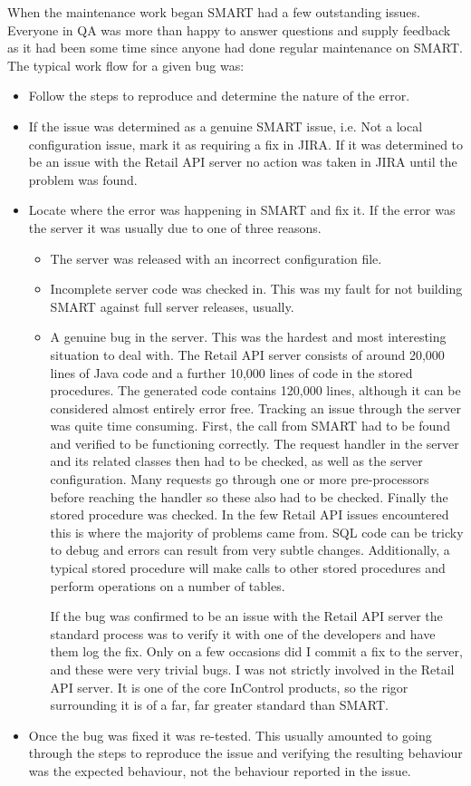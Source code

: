 \documentclass[a4paper, 11pt, titlepage]{article}
\begin{document}
When the maintenance work began SMART had a few outstanding issues. Everyone in QA was more than happy to answer questions and supply feedback as it had been some time since anyone had done regular maintenance on SMART. 
The typical work flow for a given bug was:
\begin{itemize} 
\item Follow the steps to reproduce and determine the nature of the error. 
\item If the issue was determined as a genuine SMART issue, i.e. Not a local configuration issue, mark it as requiring a fix in JIRA. If it was determined to be an issue with the Retail API server no action was taken in JIRA until the problem was found. 
\item Locate where the error was happening in SMART and fix it. If the error was the server it was usually due to one of three reasons. 
\begin{itemize} 
\item The server was released with an incorrect configuration file. 
\item Incomplete server code was checked in. This was my fault for not building SMART against full server releases, usually. 
\item A genuine bug in the server. This was the hardest and most interesting situation to deal with. The Retail API server consists of around 20,000 lines of Java code and a further 10,000 lines of code in the stored procedures. The generated code contains 120,000 lines, although it can be considered almost entirely error free. Tracking an issue through the server was quite time consuming. First, the call from SMART had to be found and verified to be functioning correctly. The request handler in the server and its related classes then had to be checked, as well as the server configuration. Many requests go through one or more pre-processors before reaching the handler so these also had to be checked. Finally the stored procedure was checked. In the few Retail API issues encountered this is where the majority of problems came from. SQL code can be tricky to debug and errors can result from very subtle changes. Additionally, a typical stored procedure will make calls to other stored procedures and perform operations on a number of tables. 
 
If the bug was confirmed to be an issue with the Retail API server the standard process was to verify it with one of the developers and have them log the fix. Only on a few occasions did I commit a fix to the server, and these were very trivial bugs. I was not strictly involved in the Retail API server. It is one of the core InControl products, so the rigor surrounding it is of a far, far greater standard than SMART. 
\end{itemize} 
\item Once the bug was fixed it was re-tested. This usually amounted to going through the steps to reproduce the issue and verifying the resulting behaviour was the expected behaviour, not the behaviour reported in the issue. 
\end{itemize} 
\end{document}

